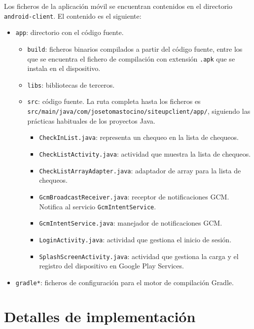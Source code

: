 Los ficheros de la aplicación móvil se encuentran contenidos en el directorio
\texttt{android-client}. El contenido es el siguiente:

\begin{itemize}
\item \texttt{app}: directorio con el código fuente.
  \begin{itemize}
  \item \texttt{build}: ficheros binarios compilados a partir del código fuente,
    entre los que se encuentra el fichero de compilación con extensión
    \texttt{.apk} que se instala en el dispositivo.
  \item \texttt{libs}: bibliotecas de terceros.
  \item \texttt{src}: código fuente. La ruta completa hasta los ficheros es \\
    \texttt{src/main/java/com/josetomastocino/siteupclient/app/}, siguiendo las
    prácticas habituales de los proyectos Java.

    \begin{itemize}
    \item \texttt{CheckInList.java}: representa un chequeo en la lista de chequeos.
    \item \texttt{CheckListActivity.java}: actividad que muestra la lista de chequeos.
    \item \texttt{CheckListArrayAdapter.java}: adaptador de array para la lista de chequeos.
    \item \texttt{GcmBroadcastReceiver.java}: receptor de notificaciones GCM. Notifica al servicio \texttt{GcmIntentService}.
    \item \texttt{GcmIntentService.java}: manejador de notificaciones GCM.
    \item \texttt{LoginActivity.java}: actividad que gestiona el inicio de sesión.
    \item \texttt{SplashScreenActivity.java}: actividad que gestiona la carga y
      el registro del dispositivo en Google Play Services.
    \end{itemize}
  \end{itemize}

\item \texttt{gradle*}: ficheros de configuración para el motor de compilación
  Gradle.
\end{itemize}

\section{Detalles de implementación}


